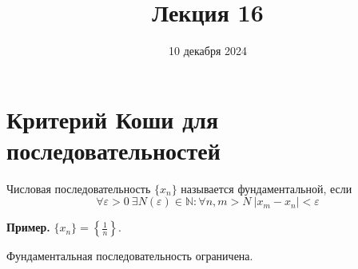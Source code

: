 \documentclass{article}
\title{Лекция 16}
\author{10 декабря 2024}
\date{}
\begin{document}
\maketitle

\section{Критерий Коши для последовательностей}

\begin{definition}
    Числовая последовательность \(\{x_n\}\) называется фундаментальной, если
    \[
        \forall \varepsilon > 0\ \exists N(\varepsilon) \in \mathbb{N}: \forall n, m > N\ \left\vert x_{m} - x_{n} \right\vert < \varepsilon
    \] 
\end{definition}
\noindent \textbf{Пример.} \(\displaystyle \{x_n\} = \left\{\frac{1}{n}\right\}\).

\begin{lemma}
    Фундаментальная последовательность ограничена.
\end{lemma}
\end{document}
